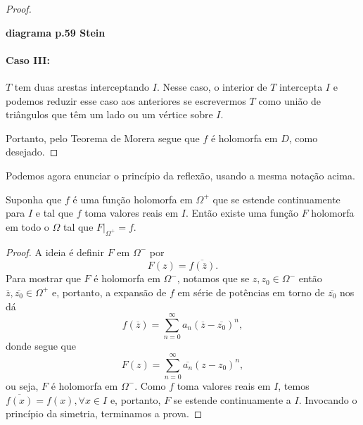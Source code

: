 \begin{proof}
        \begin{center}
            \textbf{diagrama p.59 Stein}
        \end{center}
        
        \paragraph{Caso III:} $T$ tem duas arestas interceptando $I$. Nesse caso, o interior
        de $T$ intercepta $I$ e podemos reduzir esse caso aos anteriores se escrevermos $T$
        como união de triângulos que têm um lado ou um vértice sobre $I$.
        
        Portanto, pelo Teorema de Morera segue que $f$ é holomorfa em $D$, como desejado.
    \end{proof}
    
    Podemos agora enunciar o princípio da reflexão, usando a mesma notação acima.
    
    \begin{teorema}
    \label{teo-reflexao-schwarz}
        Suponha que $f$ é uma função holomorfa em $\Omega^+$ que se estende 
        continuamente para $I$ e tal que $f$ toma valores reais em $I$. 
        Então existe uma função $F$ holomorfa em todo o $\Omega$ tal que
        $F\big|_{\Omega^+} = f$.
    \end{teorema}
        
    \begin{proof}
        A ideia é definir $F$ em $\Omega^-$ por
        \begin{equation*}
            F(z) = \overline{f(\overline{z})} .
        \end{equation*}
        Para mostrar que $F$ é holomorfa em $\Omega^-$, notamos que se $z, z_0\in\Omega^-$
        então $\overline{z}, \overline{z_0}\in\Omega^+$ e, portanto, a expansão de $f$
        em série de potências em torno de $\overline{z_0}$ nos dá
        \begin{equation*}
            f(\overline{z}) = \sum_{n=0}^{\infty} a_n (\overline{z} - \overline{z_0})^n,
        \end{equation*}
        donde segue que
        \begin{equation*}
            F(z) = \sum_{n=0}^{\infty} \overline{a_n} (z - z_0)^n,
        \end{equation*}
        ou seja, $F$ é holomorfa em $\Omega^-$. Como $f$ toma valores reais em $I$, temos
        $\overline{f(x)} = f(x), \forall x\in I$ e, portanto, $F$ se estende continuamente
        a $I$. Invocando o princípio da simetria, terminamos a prova.
    \end{proof}
%

